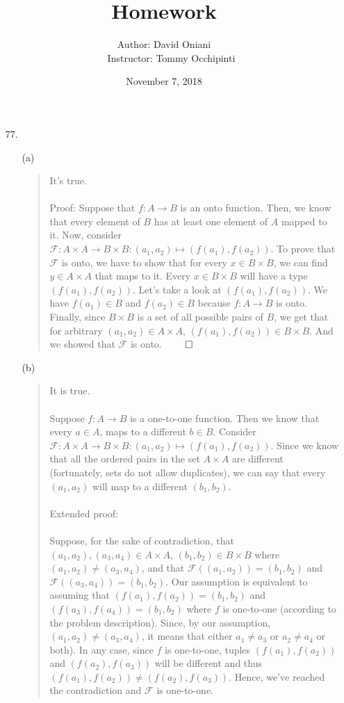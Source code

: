 \documentclass[12pt, a4paper]{article}
\title{\bf{Homework \textnumero 11}}
\author{Author: David Oniani
\\
\ \ \ Instructor: Tommy Occhipinti}
\date{November 7, 2018}
\begin{document}
\maketitle

\begin{itemize}
\item[77.]
\begin{itemize}
\item[(a)]
\begin{quote}
It's true.\\\\
Proof: Suppose that $f : A \rightarrow B$ is an onto function.
Then, we know that every element of $B$ has at least one element
of $A$ mapped to it. Now, consider $\mathcal{F} : A \times A \rightarrow B \times B : (a_1, a_2) \mapsto (f(a_1), f(a_2))$.
To prove that $\mathcal{F}$ is onto, we have to show that for every $x \in B \times B$, we can find $y \in A \times A$ that maps
to it. Every $x \in B \times B$ will have a type $(f(a_1), f(a_2))$. Let's take a look at $(f(a_1), f(a_2))$.
We have $f(a_1) \in B$ and $f(a_2) \in B$ because $f : A \rightarrow B$ is onto. Finally, since $B \times B$
is a set of all possible pairs of $B$, we get that for arbitrary $(a_1, a_2) \in A \times A$, $(f(a_1), f(a_2)) \in B \times B$.
And we showed that $\mathcal{F}$ is onto.
$\qed$
\end{quote}

\item[]

\item[(b)]
\begin{quote}
It is true.\\\\
Suppose $f : A \rightarrow B$ is a one-to-one function. Then we know that every $a \in A$,
maps to a different $b \in B$. Consider $\mathcal{F} : A \times A \rightarrow B \times B : (a_1, a_2) \mapsto (f(a_1), f(a_2))$.
Since we know that all the ordered pairs in the set $A \times A$ are different (fortunately, sets do not allow duplicates),
we can say that every $(a_1, a_2)$ will map to a different $(b_1, b_2)$.\\\\
Extended proof:\\\\
Suppose, for the sake of contradiction, that $(a_1, a_2), (a_3, a_4) \in A \times A$, $(b_1, b_2) \in B \times B$ where $(a_1, a_2) \neq (a_3, a_4)$, and
that $\mathcal{F}((a_1, a_2)) =(b_1, b_2)$ and $\mathcal{F}((a_3, a_4)) =(b_1, b_2)$. Our assumption is equivalent to assuming
that $(f(a_1), f(a_2)) =(b_1, b_2)$ and $(f(a_3), f(a_4)) = (b_1, b_2)$ where $f$ is one-to-one (according to the problem description).
Since, by our assumption, $(a_1, a_2) \neq (a_3, a_4)$, it means that either $a_1 \neq a_3$ or $a_2 \neq a_4$ or both). In any case, since $f$ is one-to-one,
tuples $(f(a_1), f(a_2))$ and $(f(a_2), f(a_3))$ will be different and thus $(f(a_1), f(a_2)) \neq (f(a_2), f(a_3))$.
Hence, we've reached the contradiction and $\mathcal{F}$ is one-to-one.
\end{quote}


\end{itemize}
\end{itemize}
\end{document}
